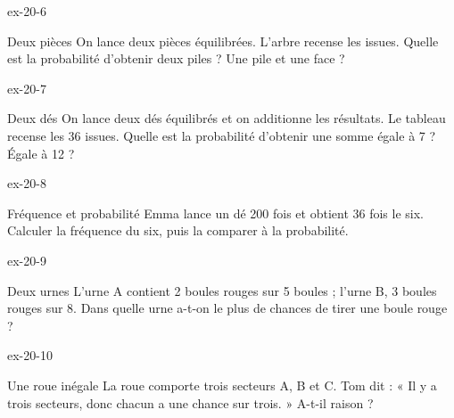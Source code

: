 \begin{blocLivre}{ex-20-6}\begin{exercice}[2]{Deux pièces}
On lance deux pièces équilibrées. L’arbre recense les issues. Quelle est la probabilité d’obtenir deux piles ? Une pile et une face ?
\label{fig-ex-20-6}
\end{exercice}\end{blocLivre}
\begin{blocLivre}{ex-20-7}\begin{exercice}[2]{Deux dés}
On lance deux dés équilibrés et on additionne les résultats. Le tableau recense les 36 issues. Quelle est la probabilité d’obtenir une somme égale à 7 ? Égale à 12 ?
\label{fig-ex-20-7}
\end{exercice}\end{blocLivre}
\begin{blocLivre}{ex-20-8}\begin{exercice}[2]{Fréquence et probabilité}
Emma lance un dé 200 fois et obtient 36 fois le six. Calculer la fréquence du six, puis la comparer à la probabilité.
\end{exercice}\end{blocLivre}
\begin{blocLivre}{ex-20-9}\begin{exercice}[2]{Deux urnes}
L’urne A contient 2 boules rouges sur 5 boules ; l’urne B, 3 boules rouges sur 8. Dans quelle urne a-t-on le plus de chances de tirer une boule rouge ?
\label{fig-ex-20-9}
\end{exercice}\end{blocLivre}
\begin{blocLivre}{ex-20-10}\begin{exercice}[2]{Une roue inégale}
La roue comporte trois secteurs A, B et C. Tom dit : « Il y a trois secteurs, donc chacun a une chance sur trois. » A-t-il raison ?
\label{fig-ex-20-10}
\end{exercice}\end{blocLivre}

